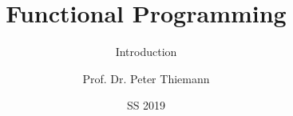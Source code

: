 
\title{Functional Programming}
\subtitle{Introduction}

\author[Peter Thiemann]{Prof. Dr. Peter Thiemann}
\date{SS 2019}

